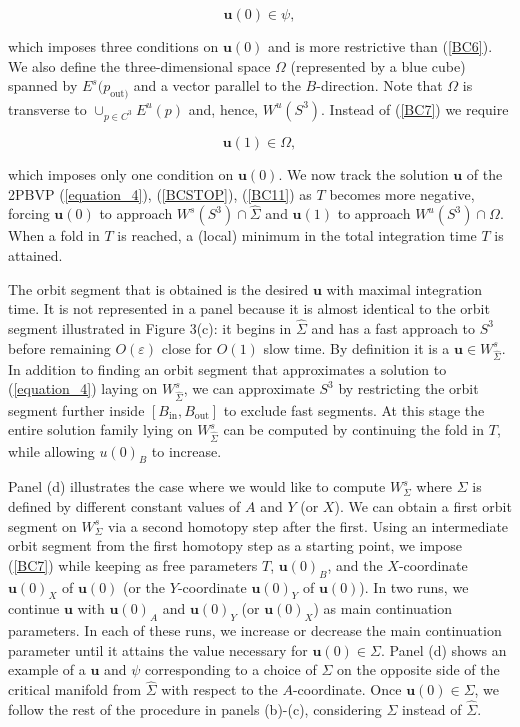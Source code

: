 \documentclass{ws-ijbc}
\begin{document}
    
\begin{equation}
\mathbf{u}(0) \in \psi,
\label{BCSTOP}
\end{equation}
    
\noindent
which imposes three conditions on $\mathbf{u}(0)$ and is more restrictive than (\ref{BC6}).  We also define the three-dimensional space $\Omega$ (represented by a blue cube) spanned by $E^s(p_{\text{out})}$ and a vector parallel to the $B$-direction.  Note that $\Omega$ is transverse to $\cup_{p \in C^3}E^u(p)$ and, hence, $W^u(S^3)$.  Instead of (\ref{BC7}) we require
    
\begin{equation}
\mathbf{u}(1) \in \Omega,
\label{BC11}
\end{equation}
    
\noindent
which imposes only one condition on $\mathbf{u}(0)$.  We now track the solution $\mathbf{u}$ of the 2PBVP (\ref{equation_4}), (\ref{BCSTOP}), (\ref{BC11}) as $T$ becomes more negative, forcing $\mathbf{u}(0)$ to approach $W^s(S^3) \cap \widehat{\Sigma}$ and $\mathbf{u}(1)$ to approach $W^u(S^3) \cap \Omega$. When a fold in $T$ is reached, a (local) minimum in the total integration time $T$ is attained.

The orbit segment that is obtained is the desired $\mathbf{u}$ with maximal integration time.  It is not represented in a panel because it is almost identical to the orbit segment illustrated in Figure 3(c): it begins in $\widehat{\Sigma}$ and has a fast approach to $S^3$ before remaining $O(\varepsilon)$ close for $O(1)$ slow time.  By definition it is a $\mathbf{u} \in W^{s}_{\widehat{\Sigma}}$.  In addition to finding an orbit segment that approximates a solution to (\ref{equation_4}) laying on $W^s_{\widehat{\Sigma}}$, we can approximate $S^3$ by restricting the orbit segment further inside $[B_{\text{in}},B_{\text{out}}]$ to exclude fast segments. At this stage the entire solution family lying on $W^s_{\widehat{\Sigma}}$ can be computed by continuing the fold in $T$, while allowing $u(0)_B$ to increase.

Panel (d) illustrates the case where we would like to compute $W^{s}_{\Sigma}$ where $\Sigma$ is defined by different constant values of $A$ and $Y$ (or $X$).  We can obtain a first orbit segment on $W^{s}_{\Sigma}$ via a second homotopy step after the first.  Using an intermediate orbit segment from the first homotopy step as a starting point, we impose (\ref{BC7}) while keeping as free parameters $T$, $\mathbf{u}(0)_B$, and the $X$-coordinate $\mathbf{u}(0)_X$ of $\mathbf{u}(0)$ (or the $Y$-coordinate  $\mathbf{u}(0)_Y$ of $\mathbf{u}(0)$).  In two runs, we continue $\mathbf{u}$ with $\mathbf{u}(0)_A$ and $\mathbf{u}(0)_Y$ (or $\mathbf{u}(0)_X$) as main continuation parameters.  In each of these runs, we increase or decrease the main continuation parameter until it attains the value necessary for $\mathbf{u}(0) \in \Sigma$.  Panel (d) shows an example of a $\mathbf{u}$ and $\psi$ corresponding to a choice of $\Sigma$ on the opposite side of the critical manifold from $\widehat{\Sigma}$ with respect to the $A$-coordinate.  Once $\mathbf{u}(0) \in \Sigma$, we follow the rest of the procedure in panels (b)-(c), considering $\Sigma$ instead of $\widehat{\Sigma}$.
\end{document}

